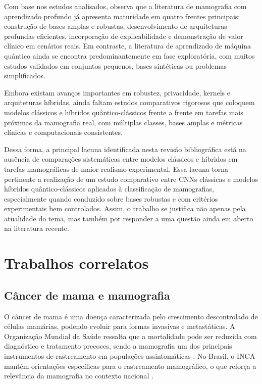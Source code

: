 \documentclass[
    12pt,
    openright,
    oneside,
    a4paper,
    english,
    brazil
]{abntex2}
\begin{document}
Com base nos estudos analisados, observa que a literatura de mamografia com aprendizado profundo já apresenta maturidade em quatro frentes principais: construção de bases amplas e robustas, desenvolvimento de arquiteturas profundas eficientes, incorporação de explicabilidade e demonstração de valor clínico em cenários reais. Em contraste, a literatura de aprendizado de máquina quântico ainda se encontra predominantemente em fase exploratória, com muitos estudos validados em conjuntos pequenos, bases sintéticas ou problemas simplificados.

Embora existam avanços importantes em robustez, privacidade, kernels e arquiteturas híbridas, ainda faltam estudos comparativos rigorosos que coloquem modelos clássicos e híbridos quântico-clássicos frente a frente em tarefas mais próximas da mamografia real, com múltiplas classes, bases amplas e métricas clínicas e computacionais consistentes.

Dessa forma, a principal lacuna identificada nesta revisão bibliográfica está na ausência de comparações sistemáticas entre modelos clássicos e híbridos em tarefas mamográficas de maior realismo experimental. Essa lacuna torna pertinente a realização de um estudo comparativo entre CNNs clássicas e modelos híbridos quântico-clássicos aplicados à classificação de mamografias, especialmente quando conduzido sobre bases robustas e com critérios experimentais bem controlados. Assim, o trabalho se justifica não apenas pela atualidade do tema, mas também por responder a uma questão ainda em aberto na literatura recente.


\chapter{Trabalhos correlatos}
\label{sec:referencial}

\section{Câncer de mama e mamografia}

O câncer de mama é uma doença caracterizada pelo crescimento descontrolado de células mamárias, podendo evoluir para formas invasivas e metastáticas. A Organização Mundial da Saúde ressalta que a mortalidade pode ser reduzida com diagnóstico e tratamento precoces, sendo a mamografia um dos principais instrumentos de rastreamento em populações assintomáticas \cite{WHO2025BreastCancer}. No Brasil, o INCA mantém orientações específicas para o rastreamento mamográfico, o que reforça a relevância da mamografia no contexto nacional \cite{INCA2025Rastreamento}.
\end{document}
